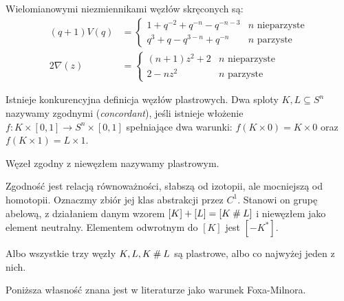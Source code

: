 \begin{proposition}
    Wielomianowymi niezmiennikami węzłów skręconych są:
    \begin{align*}
    (q+1)V(q) & = \begin{cases}
        1+q^{-2}+q^{-n}-q^{-n-3} & n \mbox{ nieparzyste} \\
        q^{3}+q-q^{3-n}+q^{-n} & n \mbox{ parzyste}
    \end{cases} \\
    2 \nabla (z) & = \begin{cases}
        (n+1) z^{2} + 2 & n \mbox{ nieparzyste} \\
        2 - nz^2 & n \mbox{ parzyste}
    \end{cases}
    \end{align*}
\end{proposition}


Istnieje konkurencyjna definicja węzłów plastrowych.
Dwa sploty $K, L \subseteq S^n$ nazywamy zgodnymi (\emph{concordant}), jeśli istnieje włożenie $f \colon K \times [0,1] \to S^n \times [0,1]$ spełniające dwa warunki: $f(K \times 0) = K \times 0$ oraz $f(K \times 1) = L \times 1$.

\begin{definition} 
    Węzeł zgodny z niewęzłem nazywamy plastrowym.
\end{definition}

Zgodność jest relacją równoważności, słabszą od izotopii, ale mocniejszą od homotopii.
Oznaczmy zbiór jej klas abstrakcji przez $C^1$.
Stanowi on grupę abelową, z działaniem danym wzorem $[K] + [L] = [K \mathbin{\#} L]$ i niewęzłem jako element neutralny. 
Elementem odwrotnym do $[K]$ jest $[-K^*]$.

\begin{proposition}
    Albo wszystkie trzy węzły $K, L, K \mathbin{\#} L$ są plastrowe, albo co najwyżej jeden z nich.
\end{proposition}

Poniższa własność znana jest w literaturze jako warunek Foxa-Milnora. 

